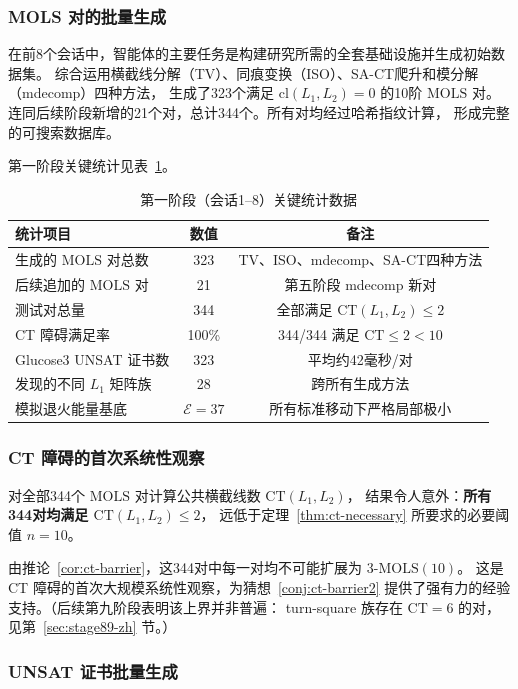 \documentclass[11pt,a4paper]{ctexart}
\theoremstyle{remark}
\newcommand{\CT}{\mathrm{CT}}
\newcommand{\cl}{\mathrm{cl}}
\newcommand{\E}{\mathcal{E}}
\newcommand{\MOLS}{\mathrm{MOLS}}
\begin{document}
\subsubsection{MOLS 对的批量生成}

在前8个会话中，智能体的主要任务是构建研究所需的全套基础设施并生成初始数据集。
综合运用横截线分解（TV）、同痕变换（ISO）、SA-CT爬升和模分解（mdecomp）四种方法，
生成了323个满足 $\cl(L_1, L_2) = 0$ 的10阶 $\MOLS$ 对。
连同后续阶段新增的21个对，总计344个。所有对均经过哈希指纹计算，
形成完整的可搜索数据库。

第一阶段关键统计见表~\ref{tab:phase1}。

\begin{table}[htbp]
  \centering
  \caption{第一阶段（会话1--8）关键统计数据}
  \label{tab:phase1}
  \begin{tabular}{lcc}
    \toprule
    统计项目 & 数值 & 备注 \\
    \midrule
    生成的 $\MOLS$ 对总数 & 323 & TV、ISO、mdecomp、SA-CT四种方法 \\
    后续追加的 $\MOLS$ 对 & 21 & 第五阶段 mdecomp 新对 \\
    测试对总量 & 344 & 全部满足 $\CT(L_1,L_2) \le 2$ \\
    CT 障碍满足率 & 100\% & 344/344 满足 $\CT \le 2 < 10$ \\
    Glucose3 UNSAT 证书数 & 323 & 平均约42毫秒/对 \\
    发现的不同 $L_1$ 矩阵族 & 28 & 跨所有生成方法 \\
    模拟退火能量基底 & $\E = 37$ & 所有标准移动下严格局部极小 \\
    \bottomrule
  \end{tabular}
\end{table}

\subsubsection{CT 障碍的首次系统性观察}

对全部344个 $\MOLS$ 对计算公共横截线数 $\CT(L_1, L_2)$，
结果令人意外：\textbf{所有344对均满足 $\CT(L_1, L_2) \le 2$}，
远低于定理~\ref{thm:ct-necessary} 所要求的必要阈值 $n = 10$。

由推论~\ref{cor:ct-barrier}，这344对中每一对均不可能扩展为 $3$-$\MOLS(10)$。
这是 CT 障碍的首次大规模系统性观察，为猜想~\ref{conj:ct-barrier2}
提供了强有力的经验支持。（后续第九阶段表明该上界并非普遍：
turn-square 族存在 $\CT=6$ 的对，见第~\ref{sec:stage89-zh} 节。）

\subsubsection{UNSAT 证书批量生成}
\end{document}
